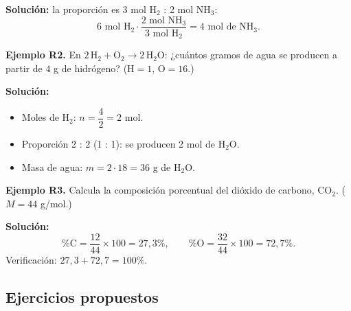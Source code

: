 \documentclass[12pt, letterpaper]{article}
\begin{document}
\begin{cuadrosolucion}
  \textbf{Solución:} la proporción es 3 mol $\text{H}_2$ : 2 mol $\text{NH}_3$:
  $$6 \text{ mol H}_2 \cdot \frac{2 \text{ mol NH}_3}{3 \text{ mol H}_2} = 4 \text{ mol de NH}_3.$$
\end{cuadrosolucion}

\textbf{Ejemplo R2.} En $2\,\text{H}_2 + \text{O}_2 \rightarrow 2\,\text{H}_2\text{O}$: ¿cuántos gramos de agua se producen a partir de $4$ g de hidrógeno? ($\text{H} = 1$, $\text{O} = 16$.)

\begin{cuadrosolucion}
  \textbf{Solución:}
  \begin{itemize}
    \item Moles de $\text{H}_2$: $n = \dfrac{4}{2} = 2$ mol.
    \item Proporción 2 : 2 (1 : 1): se producen 2 mol de $\text{H}_2\text{O}$.
    \item Masa de agua: $m = 2 \cdot 18 = 36$ g de $\text{H}_2\text{O}$.
  \end{itemize}
\end{cuadrosolucion}

\textbf{Ejemplo R3.} Calcula la composición porcentual del dióxido de carbono, $\text{CO}_2$. ($M = 44$ g/mol.)

\begin{cuadrosolucion}
  \textbf{Solución:}
  $$\% \text{C} = \frac{12}{44} \times 100 = 27{,}3\%, \qquad \% \text{O} = \frac{32}{44} \times 100 = 72{,}7\%.$$
  Verificación: $27{,}3 + 72{,}7 = 100\%$. \checkmark
\end{cuadrosolucion}

\subsection{Ejercicios propuestos}
\end{document}
